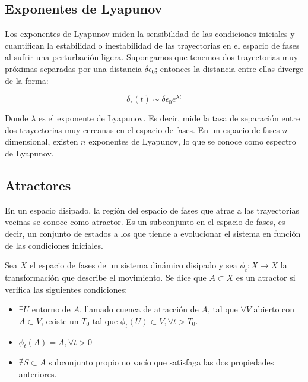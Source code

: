 \subsection{Exponentes de Lyapunov}

Los exponentes de Lyapunov miden la sensibilidad de las condiciones iniciales y cuantifican la estabilidad o inestabilidad de las trayectorias en el espacio de fases al sufrir una perturbación ligera. Supongamos que tenemos dos trayectorias muy próximas separadas por una distancia $\delta \epsilon_0$; entonces la distancia entre ellas diverge de la forma:

\begin{equation}
	\delta_\epsilon(t) \sim \delta \epsilon_0 e^{\lambda t}
\end{equation}

Donde $\lambda$ es el exponente de Lyapunov. Es decir, mide la tasa de separación entre dos trayectorias muy cercanas en el espacio de fases. En un espacio de fases $n$-dimensional, existen $n$ exponentes de Lyapunov, lo que se conoce como espectro de Lyapunov. 

\subsection{Atractores}

En un espacio disipado, la región del espacio de fases que atrae a las trayectorias vecinas se conoce como atractor. Es un subconjunto en el espacio de fases, es decir, un conjunto de estados a los que tiende a evolucionar el sistema en función de las condiciones iniciales.

\begin{definition}
	
	Sea $X$ el espacio de fases de un sistema dinámico disipado y sea $\phi_t: X \to X$ la transformación que describe el movimiento. Se dice que $A \subset X$ es un atractor si verifica las siguientes condiciones:
	
	\begin{itemize}
		
		\item $\exists U$ entorno de $A$, llamado cuenca de atracción de $A$, tal que $\forall V$ abierto con $A \subset V$, existe un $T_0$ tal que $\phi_t(U) \subset V, \forall t > T_0$.
		
		\item $\phi_t(A) = A, \forall t > 0$
		
		\item $\nexists S \subset A$ subconjunto propio no vacío que satisfaga las dos propiedades anteriores.
		
	\end{itemize} 
	
\end{definition} 

